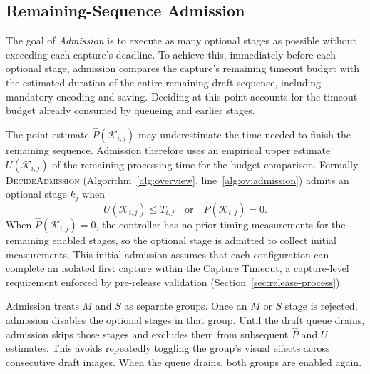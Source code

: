 \subsection{Remaining-Sequence Admission}
\label{sec:admission}

The goal of \emph{Admission} is to execute as many optional stages as possible without exceeding each capture's deadline.
To achieve this, immediately before each optional stage, admission compares the capture's remaining timeout budget with the estimated duration of the entire remaining draft sequence, including mandatory encoding and saving.
Deciding at this point accounts for the timeout budget already consumed by queueing and earlier stages.

The point estimate \(\hat P(\mathcal K_{i,j})\) may underestimate the time needed to finish the remaining sequence.
Admission therefore uses an empirical upper estimate \(U(\mathcal K_{i,j})\) of the remaining processing time for the budget comparison.
Formally, \textsc{DecideAdmission} (Algorithm~\ref{alg:overview}, line~\ref{alg:ov:admission}) admits an optional stage \(k_j\) when
\begin{equation*}
  U(\mathcal{K}_{i,j})\leq T_{i,j}
  \quad\text{or}\quad
  \hat P(\mathcal{K}_{i,j})=0.
\end{equation*}
When \(\hat P(\mathcal K_{i,j})=0\), the controller has no prior timing measurements for the remaining enabled stages, so the optional stage is admitted to collect initial measurements.
This initial admission assumes that each configuration can complete an isolated first capture within the Capture Timeout, a capture-level requirement enforced by pre-release validation (Section~\ref{sec:release-process}).

Admission treats \(M\) and \(S\) as separate groups.
Once an \(M\) or \(S\) stage is rejected, admission disables the optional stages in that group.
Until the draft queue drains, admission skips those stages and excludes them from subsequent \(\hat P\) and \(U\) estimates.
This avoids repeatedly toggling the group's visual effects across consecutive draft images.
When the queue drains, both groups are enabled again.

